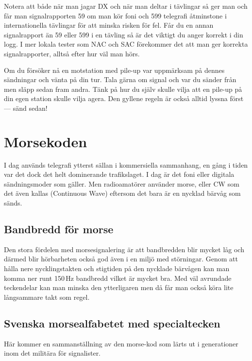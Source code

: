 Notera att både när man jagar DX och när man deltar i tävlingar så ger man och
får man signalrapporten 59 om man kör foni och 599 telegrafi åtminstone i
internationella tävlingar för att minska risken för fel. Får du en annan
signalrapport än 59 eller 599 i en tävling så är det viktigt du anger korrekt i
din logg. I mer lokala tester som NAC och SAC förekommer det att man ger
korrekta signalrapporter, alltså efter hur väl man hörs.

Om du försöker nå en motstation med pile-up var uppmärksam på dennes sändningar
och vänta på din tur. Tala gärna om signal och var du sänder från men släpp
sedan fram andra. Tänk på hur du själv skulle vilja att en pile-up på din egen
station skulle vilja agera. Den gyllene regeln är också alltid lyssna först ---
sänd sedan!

\clearpage

\section{Morsekoden}

I dag används telegrafi ytterst sällan i kommersiella sammanhang, en gång i
tiden var det dock det helt dominerande trafikslaget. I dag är det foni eller
digitala sändningsmoder som gäller. Men radioamatörer använder morse, eller CW
som det även kallas (Continuous Wave) eftersom det bara är en nycklad bärvåg
som sänds.

\subsection{Bandbredd för morse}

Den stora fördelen med morsesignalering är att bandbredden blir mycket låg och
därmed blir hörbarheten också god även i en miljö med störningar. Genom att
hålla nere nycklingstakten och stigtiden på den nycklade bärvågen kan man
komma ner runt 150\,Hz bandbredd vilket är mycket bra. Med väl avrundade
teckendelar kan man minska den ytterligaren men då får man också köra lite
långsammare takt som regel.

\subsection{Svenska morsealfabetet med specialtecken}
Här kommer en sammanställning av den morse-kod som lärts ut i
generationer inom det militära för signalister.

